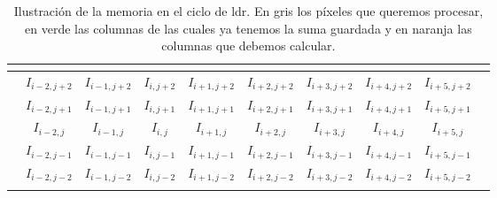 \begin{table}[h]
\centering
{}
\begin{tabular}{l|c|c|c|c|c|c|c|c|l}
 & \multicolumn{1}{l|}{}      & \multicolumn{1}{l|}{}       & \multicolumn{1}{l|}{}       & \multicolumn{1}{l|}{}
 & \multicolumn{1}{l|}{}      & \multicolumn{1}{l|}{}       & \multicolumn{1}{l|}{}       & \multicolumn{1}{l|}{}       &  \\ \hline

 & \cellcolor[HTML]{76E6A3}$I_{i-2,j+2}$ & \cellcolor[HTML]{98D0AE}$I_{i-1,j+2}$ & \cellcolor[HTML]{76E6A3}$I_{i  ,j+2}$ & \cellcolor[HTML]{98D0AE}$I_{i+1,j+2}$
 & \cellcolor[HTML]{FFBB78}$I_{i+2,j+2}$ & \cellcolor[HTML]{FF9D3E}$I_{i+3,j+2}$ & \cellcolor[HTML]{FFBB78}$I_{i+4,j+2}$ & \cellcolor[HTML]{FF9D3E}$I_{i+5,j+2}$ &  \\ \hline

 & \cellcolor[HTML]{76E6A3}$I_{i-2,j+1}$ & \cellcolor[HTML]{98D0AE}$I_{i-1,j+1}$ & \cellcolor[HTML]{76E6A3}$I_{i  ,j+1}$ & \cellcolor[HTML]{98D0AE}$I_{i+1,j+1}$
 & \cellcolor[HTML]{FFBB78}$I_{i+2,j+1}$ & \cellcolor[HTML]{FF9D3E}$I_{i+3,j+1}$ & \cellcolor[HTML]{FFBB78}$I_{i+4,j+1}$ & \cellcolor[HTML]{FF9D3E}$I_{i+5,j+1}$ &  \\ \hline

 & \cellcolor[HTML]{76E6A3}$I_{i-2,j  }$ & \cellcolor[HTML]{98D0AE}$I_{i-1,j  }$ & \cellcolor[HTML]{B1B1B1}$I_{i  ,j  }$ & \cellcolor[HTML]{B1B1B1}$I_{i+1,j  }$
 & \cellcolor[HTML]{B1B1B1}$I_{i+2,j  }$ & \cellcolor[HTML]{B1B1B1}$I_{i+3,j  }$ & \cellcolor[HTML]{FFBB78}$I_{i+4,j  }$ & \cellcolor[HTML]{FF9D3E}$I_{i+5,j  }$ &  \\ \hline

 & \cellcolor[HTML]{76E6A3}$I_{i-2,j-1}$ & \cellcolor[HTML]{98D0AE}$I_{i-1,j-1}$ & \cellcolor[HTML]{76E6A3}$I_{i  ,j-1}$ & \cellcolor[HTML]{98D0AE}$I_{i+1,j-1}$
 & \cellcolor[HTML]{FFBB78}$I_{i+2,j-1}$ & \cellcolor[HTML]{FF9D3E}$I_{i+3,j-1}$ & \cellcolor[HTML]{FFBB78}$I_{i+4,j-1}$ & \cellcolor[HTML]{FF9D3E}$I_{i+5,j-1}$ &  \\ \hline

 & \cellcolor[HTML]{76E6A3}$I_{i-2,j-2}$ & \cellcolor[HTML]{98D0AE}$I_{i-1,j-2}$ & \cellcolor[HTML]{76E6A3}$I_{i  ,j-2}$ & \cellcolor[HTML]{98D0AE}$I_{i+1,j-2}$
 & \cellcolor[HTML]{FFBB78}$I_{i+2,j-2}$ & \cellcolor[HTML]{FF9D3E}$I_{i+3,j-2}$ & \cellcolor[HTML]{FFBB78}$I_{i+4,j-2}$ & \cellcolor[HTML]{FF9D3E}$I_{i+5,j-2}$ &  \\ \hline

 & \multicolumn{1}{l|}{}      & \multicolumn{1}{l|}{}       & \multicolumn{1}{l|}{}       & \multicolumn{1}{l|}{}
 & \multicolumn{1}{l|}{}      & \multicolumn{1}{l|}{}       & \multicolumn{1}{l|}{}       & \multicolumn{1}{l|}{}       &
\end{tabular}
\caption{Ilustración de la memoria en el ciclo de ldr. En gris los píxeles que queremos procesar, en verde las columnas de las cuales ya tenemos la suma guardada y en naranja las columnas que debemos calcular.}
\end{table}

